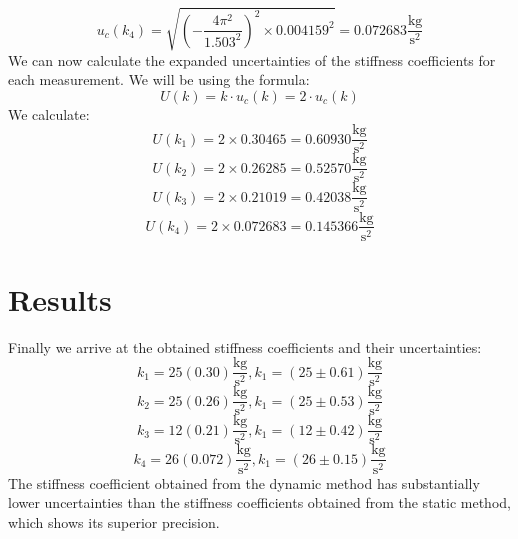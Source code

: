 \documentclass{article}
\begin{document}
\begin{equation}
    u_c(k_4) = \sqrt{(-\frac{4 \pi ^2}{1.503^2})^2 \times 0.004159^2} = 0.072683 \mathrm{\frac{kg}{s^2}}
\end{equation}
We can now calculate the expanded uncertainties of the stiffness coefficients for each measurement. We will be using the formula:
\begin{equation}
    U(k) = k \cdot u_c(k) = 2 \cdot u_c(k)
\end{equation}
We calculate:
\begin{equation}
    U(k_1) = 2 \times 0.30465 = 0.60930 \mathrm{\frac{kg}{s^2}}
\end{equation}
\begin{equation}
    U(k_2) = 2 \times 0.26285 = 0.52570 \mathrm{\frac{kg}{s^2}}
\end{equation}
\begin{equation}
    U(k_3) = 2 \times 0.21019 = 0.42038 \mathrm{\frac{kg}{s^2}}
\end{equation}
\begin{equation}
    U(k_4) = 2 \times 0.072683 = 0.145366 \mathrm{\frac{kg}{s^2}}
\end{equation}
\section{Results}
Finally we arrive at the obtained stiffness coefficients and their uncertainties:
\begin{equation}
    k_1 = 25(0.30) \mathrm{\frac{kg}{s^2}}, k_1 = (25 \pm 0.61) \mathrm{\frac{kg}{s^2}}
\end{equation}
\begin{equation}
    k_2 = 25(0.26) \mathrm{\frac{kg}{s^2}}, k_1 = (25 \pm 0.53) \mathrm{\frac{kg}{s^2}}
\end{equation}
\begin{equation}
    k_3 = 12(0.21) \mathrm{\frac{kg}{s^2}}, k_1 = (12 \pm 0.42) \mathrm{\frac{kg}{s^2}}
\end{equation}
\begin{equation}
    k_4 = 26(0.072) \mathrm{\frac{kg}{s^2}}, k_1 = (26 \pm 0.15) \mathrm{\frac{kg}{s^2}}
\end{equation}
The stiffness coefficient obtained from the dynamic method has substantially lower uncertainties than the stiffness coefficients obtained from the static method, which shows its superior precision.
\end{document}
